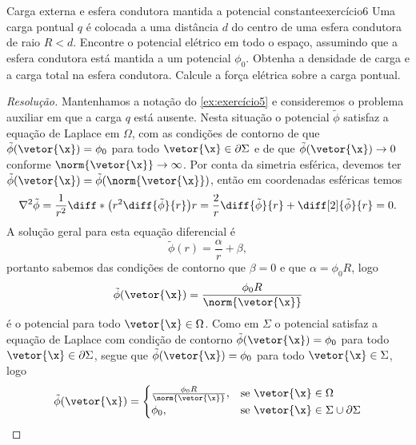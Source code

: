 \begin{exercício}{Carga externa e esfera condutora mantida a potencial constante}{exercício6}
    Uma carga pontual \(q\) é colocada a uma distância \(d\) do centro de uma esfera condutora de raio \(R < d\). Encontre o potencial elétrico em todo o espaço, assumindo que a esfera condutora está mantida a um potencial \(\phi_0\). Obtenha a densidade de carga e a carga total na esfera condutora. Calcule a força elétrica sobre a carga pontual.
\end{exercício}
\begin{proof}[Resolução]
    Mantenhamos a notação do \cref{ex:exercício5} e consideremos o problema auxiliar em que a carga \(q\) está ausente. Nesta situação o potencial \(\tilde{\phi}\) satisfaz a equação de Laplace em \(\Omega\), com as condições de contorno de que \(\tilde{\phi}(\vetor{\x}) = \phi_0\) para todo \(\vetor{\x} \in \partial \Sigma\) e de que \(\tilde{\phi}(\vetor{\x}) \to 0\) conforme \(\norm{\vetor{\x}}\to \infty\). Por conta da simetria esférica, devemos ter \(\tilde{\phi}(\vetor{\x}) = \tilde{\phi}(\norm{\vetor{\x}})\), então em coordenadas esféricas temos
    \begin{equation*}
        \nabla^2\tilde{\phi} = \frac1{r^2} \diff*{\left(r^2 \diff{\tilde{\phi}}{r}\right)}{r} = \frac{2}{r}\diff{\tilde{\phi}}{r} + \diff[2]{\tilde{\phi}}{r} = 0.
    \end{equation*}
    A solução geral para esta equação diferencial é
    \begin{equation*}
        \tilde{\phi}(r) = \frac{\alpha}{r} + \beta,
    \end{equation*}
    portanto sabemos das condições de contorno que \(\beta = 0\) e que \(\alpha = \phi_0 R\), logo
    \begin{equation*}
        \tilde{\phi}(\vetor{\x}) = \frac{\phi_0 R}{\norm{\vetor{\x}}}
    \end{equation*}
    é o potencial para todo \(\vetor{\x} \in \Omega\). Como em \(\Sigma\) o potencial satisfaz a equação de Laplace com condição de contorno \(\tilde{\phi}(\vetor{\x}) = \phi_0\) para todo \(\vetor{\x} \in \partial \Sigma\), segue que \(\tilde{\phi}(\vetor{\x}) = \phi_0\) para todo \(\vetor{\x} \in \Sigma\), logo
    \begin{equation*}
        \tilde{\phi}(\vetor{\x}) = \begin{cases}
            \frac{\phi_0R}{\norm{\vetor{\x}}}, & \text{se } \vetor{\x} \in \Omega\\
            \phi_0, &\text{se }\vetor{\x} \in \Sigma \cup \partial \Sigma

\end{cases}
\end{equation*}
\end{proof}
